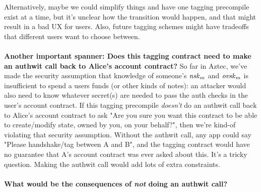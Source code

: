 Alternatively, maybe we could simplify things and have one tagging precompile exist at a time, but it's unclear how the transition would happen, and that might result in a bad UX for users.
Also, future tagging schemes might have tradeoffs that different users want to choose between.\\
\\
\textbf{Another important spanner: Does this tagging contract need to make an authwit call back to Alice's account contract?}
So far in Aztec, we've made the security assumption that knowledge of someone's $\nskm$ and $\ovskm$ is insufficient to spend a users funds (or other kinds of notes): an attacker would also need to know whatever secret(s) are needed to pass the auth checks in the user's account contract.
If this tagging precompile \textit{doesn't} do an authwit call back to Alice's account contract to ask "Are you sure you want this contract to be able to create/modify state, owned by you, on your behalf?", then we're kind-of violating that security assumption.
Without the authwit call, any app could say "Please handshake/tag between A and B", and the tagging contract would have no guarantee that A's account contract was ever asked about this.
It's a tricky question.
Making the authwit call would add lots of extra constraints.\\
\\
\textbf{What would be the consequences of \textit{not} doing an authwit call?}\\
